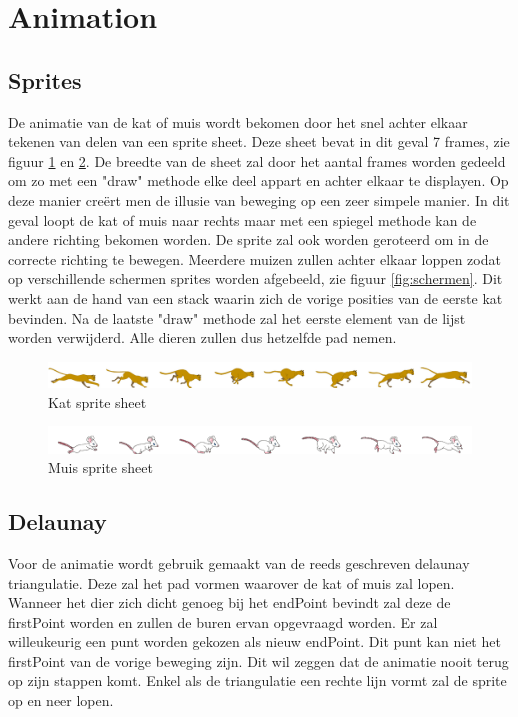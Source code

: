 \section{Animation}


\subsection{Sprites}

De animatie van de kat of muis wordt bekomen door het snel achter elkaar tekenen van delen van een sprite sheet. Deze sheet bevat in dit geval 7 frames, zie figuur \ref{fig:cat} en \ref{fig:mouse}. De breedte van de sheet zal door het aantal frames worden gedeeld om zo met een "draw" methode elke deel appart en achter elkaar te displayen. Op deze manier creërt men de illusie van beweging op een zeer simpele manier. In dit geval loopt de kat of muis naar rechts maar met een spiegel methode kan de andere richting bekomen worden. De sprite zal ook worden geroteerd om in de correcte richting te bewegen. Meerdere muizen zullen achter elkaar loppen zodat op verschillende schermen sprites worden afgebeeld, zie figuur \ref{fig:schermen}. Dit werkt aan de hand van een stack waarin zich de vorige posities van de eerste kat bevinden. Na de laatste "draw" methode zal het eerste element van de lijst worden verwijderd. Alle dieren zullen dus hetzelfde pad nemen.

\begin{figure}[H]
\centering
\includegraphics[scale=0.2]{img/cat2.png}
\caption{Kat sprite sheet \cite{catsprite}}
\label{fig:cat}
\end{figure}

\begin{figure}[H]
\centering
\includegraphics[scale=0.8]{img/mouse2_trans.png}
\caption{Muis sprite sheet \cite{mousesprite}}
\label{fig:mouse}
\end{figure}



\subsection{Delaunay}

Voor de animatie wordt gebruik gemaakt van de reeds geschreven delaunay triangulatie. Deze zal het pad vormen waarover de kat of muis zal lopen. Wanneer het dier zich dicht genoeg bij het endPoint bevindt zal deze de firstPoint worden en zullen de buren ervan opgevraagd worden. Er zal willeukeurig een punt worden gekozen als nieuw endPoint. Dit punt kan niet het firstPoint van de vorige beweging zijn. Dit wil zeggen dat de animatie nooit terug op zijn stappen komt. Enkel als de triangulatie een rechte lijn vormt zal de sprite op en neer lopen. 


